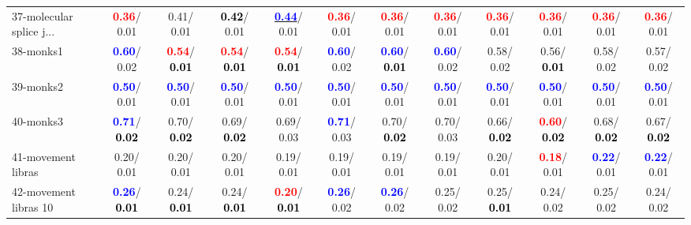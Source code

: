 \begin{table}[h]
\begin{center}
{\begin{tabular}{lc|c|c|c|c|c|c|c|c|c|c}
37-molecular splice j... & \textcolor{red}{\textbf{  0.36}}/  0.01 &   0.41/  0.01 & \textcolor{black}{\textbf{  0.42}}/  0.01 & \underline{\textcolor{blue}{\textbf{  0.44}}}/  0.01 & \textcolor{red}{\textbf{  0.36}}/  0.01 & \textcolor{red}{\textbf{  0.36}}/  0.01 & \textcolor{red}{\textbf{  0.36}}/  0.01 & \textcolor{red}{\textbf{  0.36}}/  0.01 & \textcolor{red}{\textbf{  0.36}}/  0.01 & \textcolor{red}{\textbf{  0.36}}/  0.01 & \textcolor{red}{\textbf{  0.36}}/  0.01 \\
38-monks1 & \textcolor{blue}{\textbf{  0.60}}/  0.02 & \textcolor{red}{\textbf{  0.54}}/\textcolor{black}{\textbf{  0.01}} & \textcolor{red}{\textbf{  0.54}}/\textcolor{black}{\textbf{  0.01}} & \textcolor{red}{\textbf{  0.54}}/\textcolor{black}{\textbf{  0.01}} & \textcolor{blue}{\textbf{  0.60}}/  0.02 & \textcolor{blue}{\textbf{  0.60}}/\textcolor{black}{\textbf{  0.01}} & \textcolor{blue}{\textbf{  0.60}}/  0.02 &   0.58/  0.02 &   0.56/\textcolor{black}{\textbf{  0.01}} &   0.58/  0.02 &   0.57/  0.02 \\
39-monks2 & \textcolor{blue}{\textbf{  0.50}}/  0.01 & \textcolor{blue}{\textbf{  0.50}}/  0.01 & \textcolor{blue}{\textbf{  0.50}}/  0.01 & \textcolor{blue}{\textbf{  0.50}}/  0.01 & \textcolor{blue}{\textbf{  0.50}}/  0.01 & \textcolor{blue}{\textbf{  0.50}}/  0.01 & \textcolor{blue}{\textbf{  0.50}}/  0.01 & \textcolor{blue}{\textbf{  0.50}}/  0.01 & \textcolor{blue}{\textbf{  0.50}}/  0.01 & \textcolor{blue}{\textbf{  0.50}}/  0.01 & \textcolor{blue}{\textbf{  0.50}}/  0.01 \\ \hline
40-monks3 & \textcolor{blue}{\textbf{  0.71}}/\textcolor{black}{\textbf{  0.02}} &   0.70/\textcolor{black}{\textbf{  0.02}} &   0.69/\textcolor{black}{\textbf{  0.02}} &   0.69/  0.03 & \textcolor{blue}{\textbf{  0.71}}/  0.03 &   0.70/\textcolor{black}{\textbf{  0.02}} &   0.70/  0.03 &   0.66/\textcolor{black}{\textbf{  0.02}} & \textcolor{red}{\textbf{  0.60}}/\textcolor{black}{\textbf{  0.02}} &   0.68/\textcolor{black}{\textbf{  0.02}} &   0.67/\textcolor{black}{\textbf{  0.02}} \\
41-movement libras &   0.20/  0.01 &   0.20/  0.01 &   0.20/  0.01 &   0.19/  0.01 &   0.19/  0.01 &   0.19/  0.01 &   0.19/  0.01 &   0.20/  0.01 & \textcolor{red}{\textbf{  0.18}}/  0.01 & \textcolor{blue}{\textbf{  0.22}}/  0.01 & \textcolor{blue}{\textbf{  0.22}}/  0.01 \\
42-movement libras 10 & \textcolor{blue}{\textbf{  0.26}}/\textcolor{black}{\textbf{  0.01}} &   0.24/\textcolor{black}{\textbf{  0.01}} &   0.24/\textcolor{black}{\textbf{  0.01}} & \textcolor{red}{\textbf{  0.20}}/\textcolor{black}{\textbf{  0.01}} & \textcolor{blue}{\textbf{  0.26}}/  0.02 & \textcolor{blue}{\textbf{  0.26}}/  0.02 &   0.25/  0.02 &   0.25/\textcolor{black}{\textbf{  0.01}} &   0.24/  0.02 &   0.25/  0.02 &   0.24/  0.02 \\

\end{tabular}}
\end{center}
\end{table}
